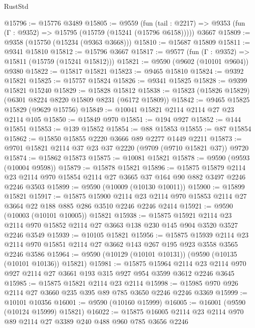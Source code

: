 \begin{lexlean}{RustStd}
\begin{coremodule}
@15796 := @15776 @3489
@15805 := @9559
    (fun (tail : @2217) => @9353 (fun (Γ : @9352) => @15795 (@15759 (@15241 (@15796 @6158)))))
    @3667
@15809 := @9358 (@15750 (@15234 (@9363 @3668)))
@15810 := @15687 @15809
@15811 := @9341 @15810
@15812 := @15796 @3667
@15817 := @9577 (fun (Γ : @9352) => @15811 (@15759 (@15241 @15812)))
@15821 := @9590 (@9602 (@10101 @9604)) @9380
@15822 := @15817 @15821
@15823 := @9465 @15810
@15824 := @9392 @15821
@15825 := @15757 @15824
@15826 := @9341 @15825
@15828 := @9399 @15821 @15240
@15829 := @15828 @15812
@15838 := @15823 (@15826 @15829) (@6301 @8224 @8220 @15809 @8231 (@6172 @15809))
@15842 := @9465 @15825 @15829 (@9629 @15756)
@15849 := @10041 @15821 @2114 @2114 @27 @23 @2114 @105
@15850 := @15849 @970
@15851 := @194 @927
@15852 := @144 @15851
@15853 := @139 @15852
@15854 := @88 @15853
@15855 := @87 @15854
@15862 := @15850 @15855 @2220 @3666 @89 @2277 @1449 @2211
@15873 := @9701 @15821 @2114 @37 @23 @37 @2220 (@9709 (@9710 @15821 @37)) @9720
@15874 := @15862 @15873
@15875 := @10081 @15821
@15878 := @9590 (@9593 (@10004 @9598))
@15879 := @15878 @15821
@15896 := @15875
    @15879
    @2114
    @23
    @2114
    @970
    @15854
    @2114
    @27
    @3665
    @37
    @164
    @90
    @882
    @3497
    @2246
    @2246
    @3503
@15899 := @9590 (@10009 (@10130 @10011))
@15900 := @15899 @15821
@15917 := @15875
    @15900
    @2114
    @23
    @2114
    @970
    @15853
    @2114
    @27
    @3664
    @22
    @188
    @885
    @286
    @3510
    @2246
    @2246
    @2414
@15921 := @9590 (@10003 (@10101 @10005)) @15821
@15938 := @15875
    @15921
    @2114
    @23
    @2114
    @970
    @15852
    @2114
    @27
    @3663
    @138
    @230
    @145
    @904
    @3520
    @3527
    @2246
    @3549
@15939 := @10105 @15821
@15956 := @15875
    @15939
    @2114
    @23
    @2114
    @970
    @15851
    @2114
    @27
    @3662
    @143
    @267
    @195
    @923
    @3558
    @3565
    @2246
    @3586
@15964 := @9590 (@10129 (@10101 @10131)) (@9590 (@10135 (@10101 @10136)) @15821)
@15981 := @15875
    @15964
    @2114
    @23
    @2114
    @970
    @927
    @2114
    @27
    @3661
    @193
    @315
    @927
    @954
    @3599
    @3612
    @2246
    @3645
@15985 := @15875 @15821 @2114 @23 @2114
@15998 := @15985 @970 @926 @2114 @27 @3660 @235 @395 @89 @785 @3650 @2246 @2246 @3369
@15999 := @10101 @10356
@16001 := @9590 (@10160 @15999)
@16005 := @16001 (@9590 (@10124 @15999) @15821)
@16022 := @15875
    @16005
    @2114
    @23
    @2114
    @970
    @89
    @2114
    @27
    @3389
    @240
    @488
    @960
    @785
    @3656
    @2246

\end{coremodule}
\end{lexlean}
